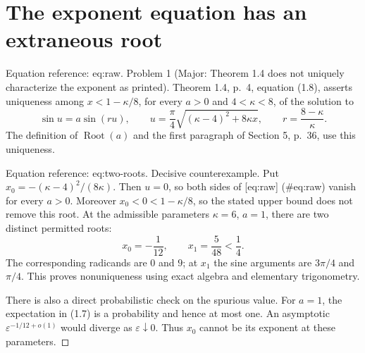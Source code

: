 \documentclass[10pt]{article}
\begin{document}
\section*{The exponent equation has an extraneous root}
Equation reference: eq:raw. Problem 1 (Major: Theorem 1.4 does not uniquely characterize the exponent as printed).  Theorem 1.4, p. 4, equation (1.8), asserts uniqueness among \(x<1-\kappa/8\), for every \(a>0\) and \(4<\kappa<8\), of the solution to \[
 \sin u=a\sin(ru),\qquad
 u=\frac{\pi}{4}\sqrt{(\kappa-4)^2+8\kappa x},\qquad
 r=\frac{8-\kappa}{\kappa}.\] The definition of \(\operatorname{Root}(a)\) and the first paragraph of Section 5, p. 36, use this uniqueness.\par
Equation reference: eq:two-roots. Decisive counterexample. Put \(x_0=-(\kappa-4)^2/(8\kappa)\). Then \(u=0\), so both sides of [eq:raw] (\#eq:raw) vanish for every \(a>0\). Moreover \(x_0<0<1-\kappa/8\), so the stated upper bound does not remove this root. At the admissible parameters \(\kappa=6\), \(a=1\), there are two distinct permitted roots: \[
 x_0=-\frac1{12},\qquad x_1=\frac5{48}<\frac14.\] The corresponding radicands are \(0\) and \(9\); at \(x_1\) the sine arguments are \(3\pi/4\) and \(\pi/4\). This proves nonuniqueness using exact algebra and elementary trigonometry.\par
There is also a direct probabilistic check on the spurious value. For \(a=1\), the expectation in (1.7) is a probability and hence at most one. An asymptotic \(\varepsilon^{-1/12+o(1)}\) would diverge as \(\varepsilon\downarrow0\). Thus \(x_0\) cannot be its exponent at these parameters. ◻\par
\end{document}
